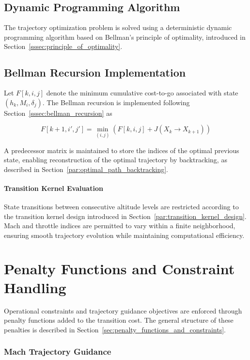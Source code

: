\subsection{Dynamic Programming Algorithm}

The trajectory optimization problem is solved using a deterministic dynamic programming algorithm based on Bellman’s principle of optimality, introduced in Section~\ref{sssec:principle_of_optimality}.

\subsection{Bellman Recursion Implementation}

Let $F[k,i,j]$ denote the minimum cumulative cost-to-go associated with state $(h_k, M_i, \delta_j)$. The Bellman recursion is implemented following Section~\ref{sssec:bellman_recursion} as

\begin{equation}
F[k+1,i',j'] = \min_{(i,j)} \left( F[k,i,j] + J(X_k \rightarrow X_{k+1}) \right)
\end{equation}


A predecessor matrix is maintained to store the indices of the optimal previous state, enabling reconstruction of the optimal trajectory by backtracking, as described in Section~\ref{par:optimal_path_backtracking}.

\paragraph{Transition Kernel Evaluation}

State transitions between consecutive altitude levels are restricted according to the transition kernel design introduced in Section~\ref{par:transition_kernel_design}. Mach and throttle indices are permitted to vary within a finite neighborhood, ensuring smooth trajectory evolution while maintaining computational efficiency.

\section{Penalty Functions and Constraint Handling}

Operational constraints and trajectory guidance objectives are enforced through penalty functions added to the transition cost. The general structure of these penalties is described in Section~\ref{sec:penalty_functions_and_constraints}.

\subsubsection{Mach Trajectory Guidance}

